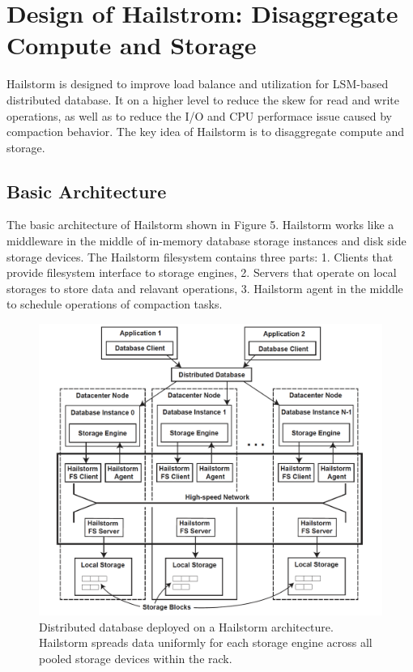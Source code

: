 \documentclass[a4paper,10pt,twoside]{article}
\begin{document}
\section{Design of Hailstrom: Disaggregate Compute and Storage}

Hailstorm is designed to improve load balance and utilization for LSM-based distributed database.
It on a higher level to reduce the skew for read and write operations, as well as to reduce the I/O and CPU performace issue caused by compaction behavior.
The key idea of Hailstorm is to disaggregate compute and storage.

\subsection{Basic Architecture}
\par
The basic architecture of Hailstorm shown in Figure 5. 
Hailstorm works like a middleware in the middle of in-memory database storage instances and disk side storage devices.
The Hailstorm filesystem contains three parts:
1. Clients that provide filesystem interface to storage engines,
2. Servers that operate on local storages to store data and relavant operations,
3. Hailstorm agent in the middle to schedule operations of compaction tasks.

\begin{figure}[h]
    \centering
	\includegraphics[scale=0.3]{Hailstorm2.png}
    \caption{ Distributed database deployed on a Hailstorm architecture.
	Hailstorm spreads data uniformly for each storage engine
	across all pooled storage devices within the rack.}
    \label{fig:mesh1}
\end{figure}
\end{document}
